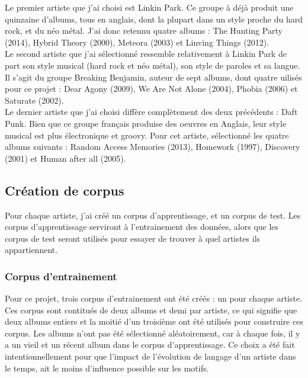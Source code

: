 \documentclass[a4paper]{article}
\begin{document}
	Le premier artiste que j'ai choisi est Linkin Park. Ce groupe à déjà produit une quinzaine d'albums, tous en anglais, dont la plupart dans un style proche du hard rock, et du néo métal. J'ai donc retennu quatre albums : The Hunting Party (2014), Hybrid Theory (2000), Meteora (2003) et Linving Things (2012).\\
	
	Le second artiste que j'ai sélectionné ressemble relativement à Linkin Park de part son style musical (hard rock et néo métal), son style de paroles et sa langue. Il s'agit du groupe Breaking Benjamin, auteur de sept albums, dont quatre uilisés pour ce projet : Dear Agony (2009), We Are Not Alone (2004), Phobia (2006) et Saturate (2002).\\
	
	Le dernier artiste que j'ai choisi diffère complètement des deux précédents : Daft Punk. Bien que ce groupe français produise des oeuvres en Anglais, leur style musical est plus électronique et groovy. Pour cet artiste, sélectionné les quatre albums suivants : Random Access Memories (2013), Homework (1997), Discovery (2001) et Human after all (2005).
	
	\subsection{Création de corpus}
	
	Pour chaque artiste, j'ai créé un corpus d'apprentissage, et un corpus de test. Les corpus d'apprentissage serviront à l'entrainement des données, alors que les corpus de test seront utilisés pour essayer de trouver à quel artistes ils appartiennent.
	
	\subsubsection{Corpus d'entrainement}
	
	Pour ce projet, trois corpus d'entrainement ont été créés : un pour chaque artiste. Ces corpus sont contitués de deux albums et demi par artiste, ce qui signifie que deux albums entiers et la moitié d'un troisième ont été utilisés pour construire ces corpus. Les albums n'ont pas été sélectionné aléatoirement, car à chaque fois, il y a un vieil et un récent album dans le corpus d'apprentissage. Ce choix a été fait intentionnellement pour que l'impact de l'évolution de langage d'un artiste dans le temps, ait le moins d'influence possible sur les motifs.\\
	
\end{document}

